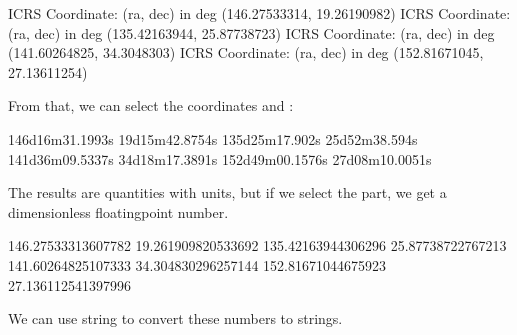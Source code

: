 \documentclass[letterpaper,10pt,english]{sphinxmanual}
\begin{document}
\begin{sphinxVerbatim}[commandchars=\\\{\}]
\PYGZlt{}ICRS Coordinate: (ra, dec) in deg
    (146.27533314, 19.26190982)\PYGZgt{}
\PYGZlt{}ICRS Coordinate: (ra, dec) in deg
    (135.42163944, 25.87738723)\PYGZgt{}
\PYGZlt{}ICRS Coordinate: (ra, dec) in deg
    (141.60264825, 34.3048303)\PYGZgt{}
\PYGZlt{}ICRS Coordinate: (ra, dec) in deg
    (152.81671045, 27.13611254)\PYGZgt{}
\end{sphinxVerbatim}

From that, we can select the coordinates  and :

\begin{sphinxVerbatim}[commandchars=\\\{\}]
   
     
\end{sphinxVerbatim}

\begin{sphinxVerbatim}[commandchars=\\\{\}]
146d16m31.1993s 19d15m42.8754s
135d25m17.902s 25d52m38.594s
141d36m09.5337s 34d18m17.3891s
152d49m00.1576s 27d08m10.0051s
\end{sphinxVerbatim}

The results are quantities with units, but if we select the  part, we get a dimensionless floating\sphinxhyphen{}point number.

\begin{sphinxVerbatim}[commandchars=\\\{\}]
   
     
\end{sphinxVerbatim}

\begin{sphinxVerbatim}[commandchars=\\\{\}]
146.27533313607782 19.261909820533692
135.42163944306296 25.87738722767213
141.60264825107333 34.304830296257144
152.81671044675923 27.136112541397996
\end{sphinxVerbatim}

We can use string  to convert these numbers to strings.
\end{document}
